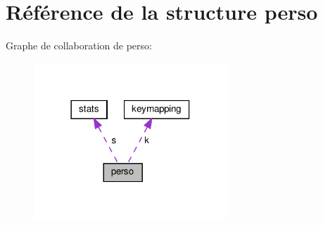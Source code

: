 \hypertarget{structperso}{}\section{Référence de la structure perso}
\label{structperso}


Graphe de collaboration de perso\+:\nopagebreak
\begin{figure}[H]
\begin{center}
\leavevmode
\includegraphics[width=206pt]{structperso__coll__graph}
\end{center}
\end{figure}
